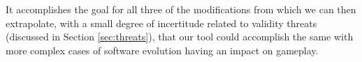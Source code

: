It accomplishes the goal for all three of the modifications from which we can then extrapolate, with a small degree of incertitude related to validity threats (discussed in Section \ref{sec:threats}), that our tool could accomplish the same with more complex cases of software evolution having an impact on gameplay. 







